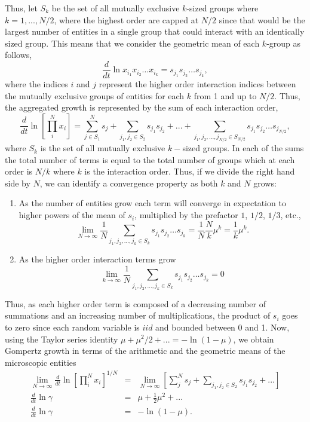\documentclass{article}
\begin{document}
Thus, let $S_k$ be the set of all mutually exclusive $k$-sized groups where $k=1,..., N/2$, where the highest order are capped at $N/2$ since that would be the largest number of entities in a single group that could interact with an identically sized group. This means that we consider the geometric mean of each $k$-group as follows,
\begin{equation}
\label{eq:modSIR4}
\frac{d}{dt} \ln x_{i_1} x_{i_2} \dots x_{i_k} = s_{j_1}s_{j_2}\dots s_{j_k}, 
\end{equation}
where the indices $i$ and $j$ represent the higher order interaction indices between the mutually exclusive groups of entities for each $k$ from 1 and up to $N/2$. Thus, the aggregated growth is represented by the sum of each interaction order,
\begin{equation}
\label{eq:MicroGomp0}
\frac{d}{dt} \ln \left[ \prod_i^N x_i \right ] = \sum_{j\in S_1}^N s_{j} + \sum_{j_1, j_2 \in S_2} s_{j_1}s_{j_2} + ... + \sum_{j_1, j_2, ..., j_{N/2} \in S_{N/2}} s_{j_1}s_{j_2}\dots s_{j_{N/2}},
\end{equation}
where $S_k$ is the set of all mutually exclusive $k-$sized groups. In each of the sums the total number of terms is equal to the total number of groups which at each order is $N/k$ where $k$ is the interaction order. Thus, if we divide the right hand side by $N$, we can identify a convergence property as both $k$ and $N$ grows:
\begin{enumerate}
\item As the number of entities grow each term will converge in expectation to higher powers of the mean of $s_i$, multiplied by the prefactor $1$, $1/2$, $1/3$, etc., 
\begin{equation}
\label{eq:MicroGomp11}
\lim_{N\rightarrow \infty} \frac{1}{N}\sum_{j_1, j_2, ..., j_k \in S_k} s_{j_1}s_{j_2}\dots s_{j_k} = \frac{1}{N}\frac{N}{k} \mu^{k} = \frac{1}{k} \mu^{k}.
\end{equation}
\item As the higher order interaction terms grow
\begin{equation}
\label{eq:MicroGomp12}
\lim_{k\rightarrow \infty} \frac{1}{N}\sum_{j_1, j_2, ..., j_k \in S_k} s_{j_1}s_{j_2}\dots s_{j_k} = 0
\end{equation}
\end{enumerate}
Thus, as each higher order term is composed of a decreasing number of summations and an increasing number of multiplications, the product of $s_i$ goes to zero since each random variable is $iid$ and bounded between 0 and 1. 
Now, using the Taylor series identity $\mu+\mu^2/2+... = -\ln(1-\mu)$, we obtain Gompertz growth in terms of the arithmetic and the geometric means of the microscopic entities
\begin{eqnarray}
\label{eq:MicroGomp13}
\lim_{N\rightarrow \infty}\frac{d}{dt} \ln \left[ \prod_i^N x_i \right ]^{1/N} &=&  \lim_{N\rightarrow \infty}\left[\sum_j^N s_{j} + \sum_{j_1, j_2 \in S_2} s_{j_1}s_{j_2} + ...\right]\\
\frac{d}{dt} \ln \gamma &=&  \mu + \frac{1}{2} \mu^2 + ...\\
\frac{d}{dt} \ln \gamma &=& - \ln (1-\mu).
\end{eqnarray}
\end{document}
